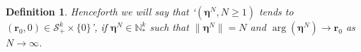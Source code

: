 \documentclass[12pt, leqno]{article}
\newcommand*{\norm}[1]{\lVert #1 \rVert}
\newtheorem{definition}{Definition}
\begin{document}


%

\begin{definition}
Henceforth we will say that `$(\bm \eta^N, N\geq 1)$  tends to $( \bm r_0, 0)\in \mathcal{S}^k_+\times \{0\}$', if $\bm \eta^N\in  \mathbb{N}^k_*$ such that $\norm{\bm\eta^N} = N$ and $\arg(\bm\eta^N)\to \bm r_0$ as $N\to\infty$.
\end{definition}
\end{document}
